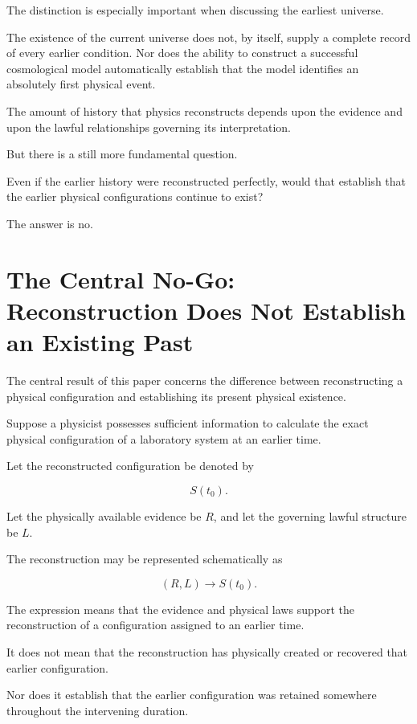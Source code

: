 \documentclass[12pt,onecolumn]{article}
\begin{document}
The distinction is especially important when discussing the earliest universe.

The existence of the current universe does not, by itself, supply a complete record of every earlier condition. Nor does the ability to construct a successful cosmological model automatically establish that the model identifies an absolutely first physical event.

The amount of history that physics reconstructs depends upon the evidence and upon the lawful relationships governing its interpretation.

But there is a still more fundamental question.

Even if the earlier history were reconstructed perfectly, would that establish that the earlier physical configurations continue to exist?

The answer is no.

\section{The Central No-Go: Reconstruction Does Not Establish an Existing Past}

The central result of this paper concerns the difference between reconstructing a physical configuration and establishing its present physical existence.

Suppose a physicist possesses sufficient information to calculate the exact physical configuration of a laboratory system at an earlier time.

Let the reconstructed configuration be denoted by

\begin{equation}
S(t_0).
\end{equation}

Let the physically available evidence be \(R\), and let the governing lawful structure be \(L\).

The reconstruction may be represented schematically as

\begin{equation}
(R,L)
\longrightarrow
S(t_0).
\end{equation}

The expression means that the evidence and physical laws support the reconstruction of a configuration assigned to an earlier time.

It does not mean that the reconstruction has physically created or recovered that earlier configuration.

Nor does it establish that the earlier configuration was retained somewhere throughout the intervening duration.
\end{document}
